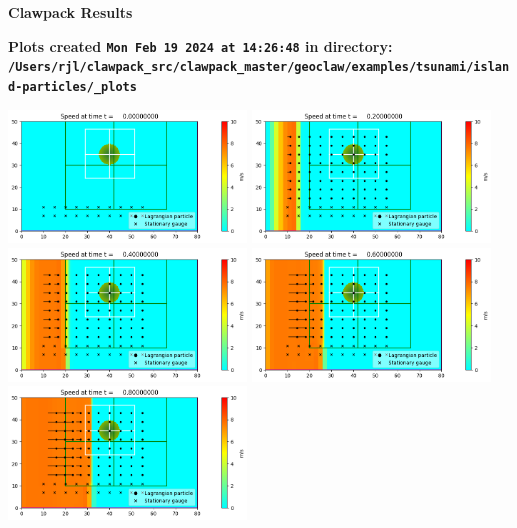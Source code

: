 \documentclass[11pt]{article}
\begin{document}
        \begin{center}{\Large\bf Clawpack Results}\vskip 5pt
        
        \bf Plots created {\tt Mon Feb 19 2024 at 14:26:48} in directory: \vskip 5pt
        \verb+/Users/rjl/clawpack_src/clawpack_master/geoclaw/examples/tsunami/island-particles/_plots+
        \end{center}
        \vskip 5pt
        \includegraphics[width=0.475\textwidth]{frame0000fig0.png}
\vskip 10pt 
\includegraphics[width=0.475\textwidth]{frame0001fig0.png}
\vskip 10pt 
\includegraphics[width=0.475\textwidth]{frame0002fig0.png}
\vskip 10pt 
\includegraphics[width=0.475\textwidth]{frame0003fig0.png}
\vskip 10pt 
\includegraphics[width=0.475\textwidth]{frame0004fig0.png}
\end{document}
